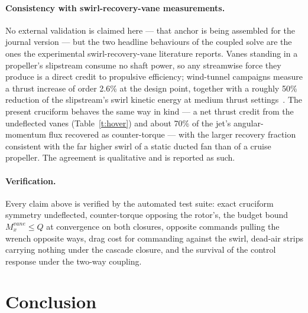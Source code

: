 \documentclass[]{aiaa-tc}%
\begin{document}
\paragraph{Consistency with swirl-recovery-vane measurements.} No
external validation is claimed here --- that anchor is being
assembled for the journal version --- but the two headline behaviours
of the coupled solve are the ones the experimental
swirl-recovery-vane literature reports. Vanes standing in a
propeller's slipstream consume no shaft power, so any streamwise
force they produce is a direct credit to propulsive efficiency;
wind-tunnel campaigns measure a thrust increase of order 2.6\% at the
design point, together with a roughly 50\% reduction of the
slipstream's swirl kinetic energy at medium thrust
settings~\cite{li2018srv,sinnige2018}. The present cruciform behaves
the same way in kind --- a net thrust credit from the undeflected
vanes (Table~\ref{t:hover}) and about 70\% of the jet's
angular-momentum flux recovered as counter-torque --- with the larger
recovery fraction consistent with the far higher swirl of a static
ducted fan than of a cruise propeller. The agreement is qualitative
and is reported as such.

\paragraph{Verification.} Every claim above is verified by the automated
test suite: exact cruciform symmetry undeflected, counter-torque
opposing the rotor's, the budget bound $M_x^{vane} \le Q$ at
convergence on both closures, opposite commands pulling the wrench
opposite ways, drag cost for commanding against the swirl, dead-air
strips carrying nothing under the cascade closure, and the survival of
the control response under the two-way coupling.

\section{Conclusion}
\end{document}
